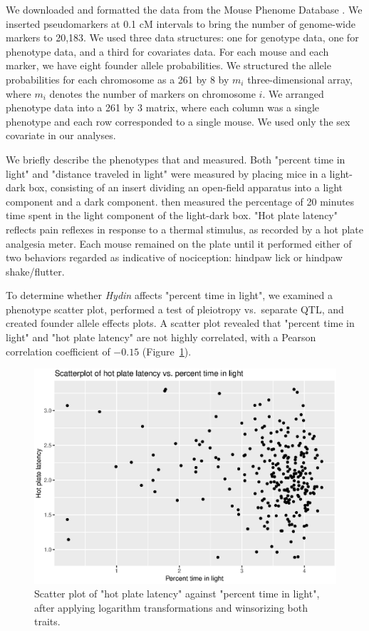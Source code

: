 \documentclass[12pt,twoside, lineno]{gsajnl}
\begin{document}
We downloaded and formatted the data from the Mouse Phenome Database
\citep{bogue2015collaborative}. We inserted pseudomarkers at 0.1 cM
intervals to bring the number of genome-wide markers to 20,183. We
used three data structures: one for genotype data, one for phenotype
data, and a third for covariates data. For each mouse and each marker,
we have eight founder allele probabilities. We structured the allele
probabilities for each chromosome as a 261 by 8 by $m_i$
three-dimensional array, where $m_i$ denotes the number of markers on
chromosome $i$. We arranged phenotype data into a 261 by 3 matrix,
where each column was a single phenotype and each row corresponded to
a single mouse. We used only the sex covariate in our analyses.

We briefly describe the phenotypes that \citet{logan2013high} and
\citet{recla2014precise} measured. Both "percent time in light" and
"distance traveled in light" were measured by placing mice in a
light-dark box, consisting of an insert dividing an open-field
apparatus into a light component and a dark component.
\citet{logan2013high} then measured the percentage of 20 minutes time
spent in the light component of the light-dark box. "Hot plate
latency" reflects pain reflexes in response to a thermal stimulus, as
recorded by a hot plate analgesia meter. Each mouse remained on the
plate until it performed either of two behaviors regarded as
indicative of nociception: hindpaw lick or hindpaw shake/flutter.




To determine whether \textit{Hydin} affects "percent time in light",
we examined a phenotype scatter plot, performed a test of pleiotropy
vs.\ separate QTL, and created founder allele effects plots. A scatter
plot revealed that "percent time in light" and "hot plate latency" are
not highly correlated, with a Pearson correlation coefficient of
$-0.15$ (Figure~\ref{fig:scatter}).

\begin{figure}
\includegraphics[width = \textwidth]{../Rmd/scatter.eps}
\caption{Scatter plot of "hot plate latency" against "percent time in
  light", after applying logarithm transformations and winsorizing
  both traits.}
\label{fig:scatter}
\end{figure}
\end{document}
